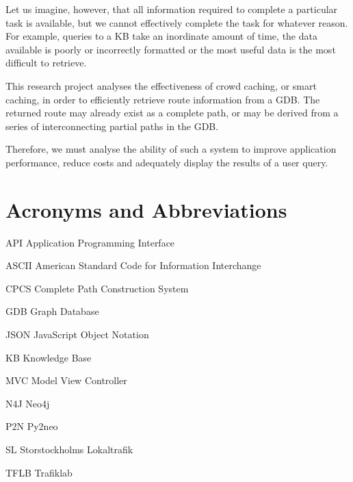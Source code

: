\documentclass[12pt]{article}   	%
\begin{document}
Let us imagine, however, that all information required to complete a particular task is available, but we cannot effectively complete the task for whatever reason. For example, queries to a KB take an inordinate amount of time, the data available is poorly or incorrectly formatted or the most useful data is the most difficult to retrieve.

This research project analyses the effectiveness of crowd caching, or smart caching, in order to efficiently retrieve route information from a GDB. The returned route may already exist as a complete path, or may be derived from a series of interconnecting partial paths in the GDB.

Therefore, we must analyse the ability of such a system to improve application performance, reduce costs and adequately display the results of a user query.
\newpage

\section*{Acronyms and Abbreviations}

API
\hspace{13.5mm}
Application Programming Interface

\noindent
ASCII
\hspace{9.5mm}
American Standard Code for Information Interchange

\noindent
CPCS
\hspace{10mm}
Complete Path Construction System

\noindent
GDB
\hspace{11.5mm}
Graph Database

\noindent
JSON
\hspace{10.5mm}
JavaScript Object Notation

\noindent
KB
\hspace{15mm}
Knowledge Base

\noindent
MVC
\hspace{11.5mm}
Model View Controller

\noindent
N4J
\hspace{14mm}
Neo4j

\noindent
P2N
\hspace{13.2mm}
Py2neo

\noindent
SL
\hspace{16.5mm}
Storstockholms Lokaltrafik

\noindent
TFLB
\hspace{10mm}
Trafiklab
\end{document}
